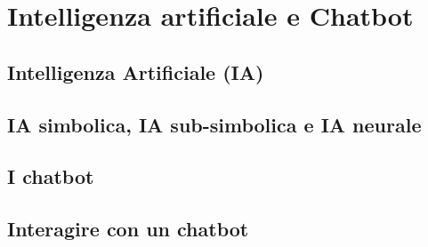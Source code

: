 \section{Intelligenza artificiale e Chatbot}

    \subsection{Intelligenza Artificiale (IA)}
    
    \subsection{IA simbolica, IA sub-simbolica e IA neurale}
    
    \subsection{I chatbot}
    
    \subsection{Interagire con un chatbot}
